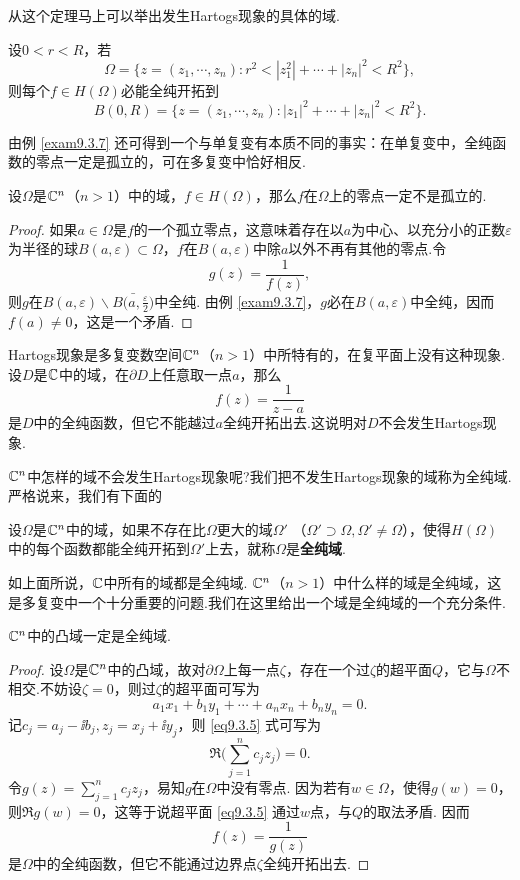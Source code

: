 从这个定理马上可以举出发生Hartogs现象的具体的域.
\begin{example}\label{exam9.3.7}
  设$0<r<R$，若
  \[
    \Omega = \{z=(z_1,\cdots,z_n):r^2 < |z_1^2| + \cdots + |z_n|^2 < R^2\},
  \]
  则每个$f\in H(\Omega)$必能全纯开拓到
  \[
    B(0,R) = \{z=(z_1,\cdots,z_n):|z_1|^2+\cdots+|z_n|^2<R^2\}.
  \]
\end{example}

由例 \ref{exam9.3.7} 还可得到一个与单复变有本质不同的事实：在单复变中，全纯函数的零点一定是孤立的，可在多复变中恰好相反.
\begin{theorem}\label{thm9.3.8}
  设$\Omega$是$\mathbb C^n$（$n>1$）中的域，$f\in H(\Omega)$，那么$f$在$\Omega$上的零点一定不是孤立的.
\end{theorem}
\begin{proof}
  如果$a\in\Omega$是$f$的一个孤立零点，这意味着存在以$a$为中心、以充分小的正数$\varepsilon$为半径的球$B(a,\varepsilon)\subset\Omega$，$f$在$B(a,\varepsilon)$中除$a$以外不再有其他的零点.令
  \[
    g(z) = \frac1{f(z)},
  \]
  则$g$在$B(a,\varepsilon)\backslash\bar{B\bigg(a,\frac\varepsilon2\bigg)}$中全纯. 由例 \ref{exam9.3.7}，$g$必在$B(a,\varepsilon)$中全纯，因而$f(a)\ne0$，这是一个矛盾.
\end{proof}

Hartogs现象是多复变数空间$\mathbb C^n$（$n>1$）中所特有的，在复平面上没有这种现象.设$D$是$\mathbb C$中的域，在$\partial D$上任意取一点$a$，那么
\[
  f(z) = \frac1{z-a}
\]
是$D$中的全纯函数，但它不能越过$a$全纯开拓出去.这说明对$D$不会发生Hartogs现象.

$\mathbb C^n$中怎样的域不会发生Hartogs现象呢?我们把不发生Hartogs现象的域称为全纯域.严格说来，我们有下面的
\begin{definition}\label{def9.3.9}
  设$\Omega$是$\mathbb C^n$中的域，如果不存在比$\Omega$更大的域$\Omega'$
  （$\Omega'\supset\Omega,\Omega'\ne\Omega$），使得$H(\Omega)$中的每个函数都能全纯开拓到$\Omega'$上去，就称$\Omega$是\textbf{全纯域}.
\end{definition}

如上面所说，$\mathbb C$中所有的域都是全纯域. $\mathbb C^n$（$n>1$）中什么样的域是全纯域，这是多复变中一个十分重要的问题.我们在这里给出一个域是全纯域的一个充分条件.
\begin{theorem}\label{thm9.3.10}
  $\mathbb C^n$中的凸域一定是全纯域.
\end{theorem}
\begin{proof}
  设$\Omega$是$\mathbb C^n$中的凸域，故对$\partial\Omega$上每一点$\zeta$，存在一个过$\zeta$的超平面$Q$，它与$\Omega$不相交.不妨设$\zeta=0$，则过$\zeta$的超平面可写为
  \begin{equation}\label{eq9.3.5}
    a_1x_1 + b_1y_1 + \cdots + a_nx_n + b_ny_n = 0.
  \end{equation}
  记$c_j=a_j-\ii b_j,z_j=x_j+\ii y_j$，则 \eqref{eq9.3.5} 式可写为
  \[
    \Re\bigg(\sum_{j=1}^nc_jz_j\bigg) = 0.
  \]
  令$g(z)=\sum_{j=1}^nc_jz_j$，易知$g$在$\Omega$中没有零点. 因为若有$w\in\Omega$，使得$g(w)=0$，则$\Re g(w)=0$，这等于说超平面 \eqref{eq9.3.5} 通过$w$点，与$Q$的取法矛盾. 因而
  \[
    f(z) = \frac1{g(z)}
  \]
  是$\Omega$中的全纯函数，但它不能通过边界点$\zeta$全纯开拓出去.
\end{proof}

